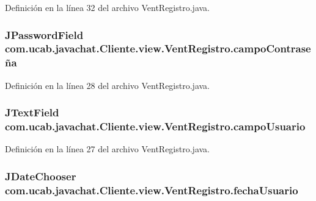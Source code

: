 Definición en la línea 32 del archivo Vent\-Registro.\-java.

\hypertarget{classcom_1_1ucab_1_1javachat_1_1_cliente_1_1view_1_1_vent_registro_a9dd634f9a89cdfe0468fde9045892914}{
\subsubsection[{campo\-Contraseña}]{\setlength{\rightskip}{0pt plus 5cm}J\-Password\-Field com.\-ucab.\-javachat.\-Cliente.\-view.\-Vent\-Registro.\-campo\-Contraseña}}\label{classcom_1_1ucab_1_1javachat_1_1_cliente_1_1view_1_1_vent_registro_a9dd634f9a89cdfe0468fde9045892914}


Definición en la línea 28 del archivo Vent\-Registro.\-java.

\hypertarget{classcom_1_1ucab_1_1javachat_1_1_cliente_1_1view_1_1_vent_registro_a5c682f1095f71bd4d1328ac0aeefa27b}{
\subsubsection[{campo\-Usuario}]{\setlength{\rightskip}{0pt plus 5cm}J\-Text\-Field com.\-ucab.\-javachat.\-Cliente.\-view.\-Vent\-Registro.\-campo\-Usuario}}\label{classcom_1_1ucab_1_1javachat_1_1_cliente_1_1view_1_1_vent_registro_a5c682f1095f71bd4d1328ac0aeefa27b}


Definición en la línea 27 del archivo Vent\-Registro.\-java.

\hypertarget{classcom_1_1ucab_1_1javachat_1_1_cliente_1_1view_1_1_vent_registro_a5abb04a5876abd5fd60f69d9e462eb4d}{
\subsubsection[{fecha\-Usuario}]{\setlength{\rightskip}{0pt plus 5cm}J\-Date\-Chooser com.\-ucab.\-javachat.\-Cliente.\-view.\-Vent\-Registro.\-fecha\-Usuario}}\label{classcom_1_1ucab_1_1javachat_1_1_cliente_1_1view_1_1_vent_registro_a5abb04a5876abd5fd60f69d9e462eb4d}


